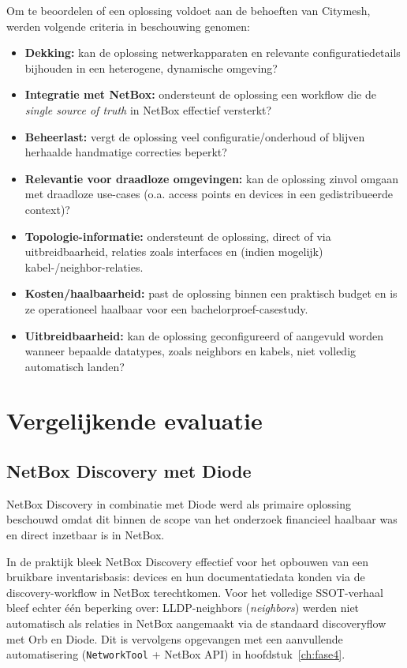 Om te beoordelen of een oplossing voldoet aan de behoeften van Citymesh, werden volgende criteria in beschouwing genomen:

\begin{itemize}
  \item \textbf{Dekking:} kan de oplossing netwerkapparaten en relevante configuratiedetails bijhouden in een heterogene, dynamische omgeving?
  \item \textbf{Integratie met NetBox:} ondersteunt de oplossing een workflow die de \emph{single source of truth} in NetBox effectief versterkt?
  \item \textbf{Beheerlast:} vergt de oplossing veel configuratie/onderhoud of blijven herhaalde handmatige correcties beperkt?
  \item \textbf{Relevantie voor draadloze omgevingen:} kan de oplossing zinvol omgaan met draadloze use-cases (o.a. access points en devices in een gedistribueerde context)?
  \item \textbf{Topologie-informatie:} ondersteunt de oplossing, direct of via uitbreidbaarheid, relaties zoals interfaces en (indien mogelijk) kabel-/neighbor-relaties.
  \item \textbf{Kosten/haalbaarheid:} past de oplossing binnen een praktisch budget en is ze operationeel haalbaar voor een bachelorproef-casestudy.
  \item \textbf{Uitbreidbaarheid:} kan de oplossing geconfigureerd of aangevuld worden wanneer bepaalde datatypes, zoals neighbors en kabels, niet volledig automatisch landen?
 \end{itemize}

\section{Vergelijkende evaluatie}

\subsection{NetBox Discovery met Diode}

NetBox Discovery in combinatie met Diode werd als primaire oplossing beschouwd omdat dit binnen de scope van het onderzoek financieel haalbaar was en direct inzetbaar is in NetBox.

In de praktijk bleek NetBox Discovery effectief voor het opbouwen van een bruikbare inventarisbasis: devices en hun documentatiedata konden via de discovery-workflow in NetBox terechtkomen. Voor het volledige SSOT-verhaal bleef echter één beperking over: LLDP-neighbors (\emph{neighbors}) werden niet automatisch als relaties in NetBox aangemaakt via de standaard discoveryflow met Orb en Diode. Dit is vervolgens opgevangen met een aanvullende automatisering (\texttt{NetworkTool} + NetBox API) in hoofdstuk~\ref{ch:fase4}.

